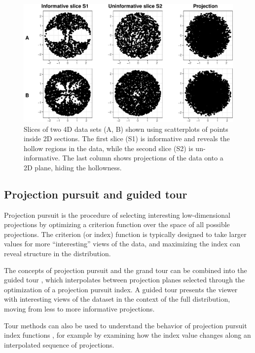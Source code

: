 \documentclass[]{interact}
\theoremstyle{plain}%
\theoremstyle{definition}
\theoremstyle{remark}
\begin{document}
\begin{figure}

{\centering \includegraphics[width=0.8\linewidth]{section_pursuit_files/figure-latex/allSlices-1} 

}

\caption{Slices of two 4D data sets (A, B) shown using scatterplots of points inside 2D sections. The first slice (S1) is informative and reveals the hollow regions in the data, while the second slice (S2) is un-informative. The last column shows projections of the data onto a 2D plane, hiding the hollowness.}\label{fig:allSlices}
\end{figure}

\hypertarget{projection-pursuit-and-guided-tour}{%
\subsection{Projection pursuit and guided
tour}\label{projection-pursuit-and-guided-tour}}

Projection pursuit is the procedure of selecting interesting
low-dimensional projections by optimizing a criterion function over the
space of all possible projections. The criterion (or index) function is
typically designed to take larger values for more ``interesting'' views
of the data, and maximizing the index can reveal structure in the
distribution.

The concepts of projection pursuit and the grand tour can be combined
into the guided tour \citep{CBCH94}, which interpolates between
projection planes selected through the optimization of a projection
pursuit index. A guided tour presents the viewer with interesting views
of the dataset in the context of the full distribution, moving from less
to more informative projections.

Tour methods can also be used to understand the behavior of projection
pursuit index functions \citep{laa2020}, for example by examining how
the index value changes along an interpolated sequence of projections.
\end{document}

